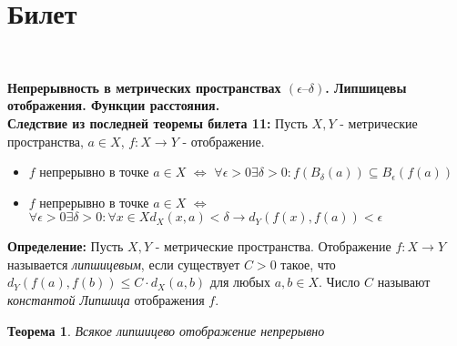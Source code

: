 \documentclass[a4paper,100pt]{article}
\theoremstyle{indented}
\newtheorem{theorem}{Теорема}
\begin{document}
\section{Билет} \

\medskip

\textbf{Непрерывность в метрических пространствах $(\epsilon–\delta)$. Липшицевы отображения. Функции расстояния.}\\

\textbf{Следствие из последней теоремы билета 11:} Пусть $X, Y$ - метрические пространства, $a \in X$, $f: X \rightarrow Y$ - отображение.
\begin{itemize}
    \item $f$ непрерывно в точке $a \in X$ $\Longleftrightarrow$ $\forall \epsilon > 0 \exists \delta > 0 : f(B_{\delta}(a)) \subseteq B_{\epsilon}(f(a))$
    \item $f$ непрерывно в точке $a \in X$ $\Longleftrightarrow$ $\forall \epsilon > 0 \exists \delta > 0 : \forall x \in X d_X(x, a) < \delta \rightarrow d_Y(f(x), f(a)) < \epsilon$
\end{itemize}
\textbf{Определение:} Пусть $X, Y$ - метрические пространства. Отображение $f: X \rightarrow Y$ называется \textit{липшицевым}, если существует $C>0$ такое, что $d_Y(f(a), f(b)) \leq C \cdot d_X(a, b)$ для любых $a, b \in X$. Число $C$ называют \textit{константой Липшица} отображения $f$.
\begin{theorem}
Всякое липшицево отображение непрерывно
\end{theorem}
\end{document}
